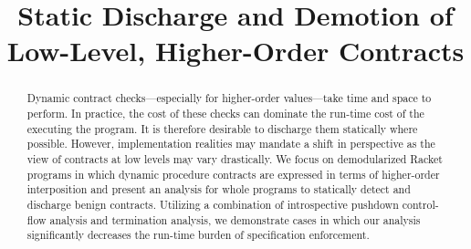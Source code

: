 \documentclass{sigplanconf}
\title{Static Discharge and Demotion of Low-Level, Higher-Order Contracts}
\begin{document}
\newcommand{\chapcalc}[0]{\ensuremath{\lambda_{\mathcal{C}}}}

% 


\maketitle

\begin{abstract}
Dynamic contract checks---especially for higher-order values---take time and space to perform.
In practice, the cost of these checks can dominate the run-time cost of the executing the program.
It is therefore desirable to discharge them statically where possible.
However, implementation realities may mandate a shift in perspective as the view of contracts at low levels may vary drastically.
We focus on demodularized Racket programs in which dynamic procedure contracts are expressed in terms of higher-order interposition and present an analysis for whole programs to statically detect and discharge benign contracts.
Utilizing a combination of introspective pushdown control-flow analysis and termination analysis, we demonstrate cases in which our analysis significantly decreases the run-time burden of specification enforcement.
\end{abstract}





% 

\setspecialsymbol{->}{$\rightarrow$}


\end{document}
